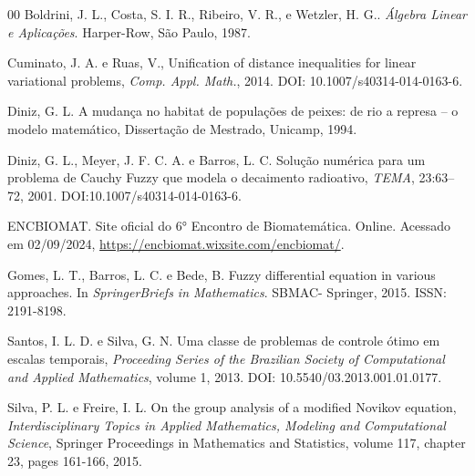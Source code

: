 \documentclass[a4paper, 11pt]{article}
\begin{document}
\begin{thebibliography}{00} \footnotesize
{}
Boldrini, J. L., Costa, S. I. R., Ribeiro, V. R., e Wetzler, H. G.. {\it Álgebra Linear e Aplicações}. Harper-Row, São Paulo, 1987.
		
Cuminato, J. A. e Ruas, V., Unification of distance inequalities for linear variational problems, {\it Comp. Appl. Math.}, 2014. DOI: 10.1007/s40314-014-0163-6.

Diniz, G. L. A mudança no habitat de populações de peixes: de rio a represa -- o modelo 
matemático, Dissertação de Mestrado, Unicamp, 1994.

Diniz, G. L., Meyer, J. F. C. A. e Barros, L. C. Solução numérica para um problema de 
Cauchy Fuzzy que modela o decaimento radioativo, {\it TEMA},  23:63--72, 2001. DOI:10.1007/s40314-014-0163-6.

 ENCBIOMAT. Site oficial do 6° Encontro de Biomatemática. Online. Acessado em 02/09/2024, \url{https://encbiomat.wixsite.com/encbiomat/}.

Gomes, L. T., Barros, L. C. e Bede, B. Fuzzy differential equation in various approaches. 
In {\it SpringerBriefs in Mathematics}. SBMAC- Springer, 2015. ISSN: 2191-8198.

 Santos, I. L. D. e Silva, G. N. Uma classe de problemas de controle ótimo 
em escalas temporais, {\it Proceeding Series of the Brazilian Society of Computational and 
Applied Mathematics}, volume 1, 2013. DOI: 10.5540/03.2013.001.01.0177.

 Silva, P. L. e Freire, I. L. On the group analysis of a modified Novikov equation, 
{\it Interdisciplinary Topics in Applied Mathematics, Modeling and Computational Science}, 
Springer Proceedings in Mathematics and Statistics,  volume 117, chapter 23, pages 161-166, 2015.

\end{thebibliography}
\end{document}
